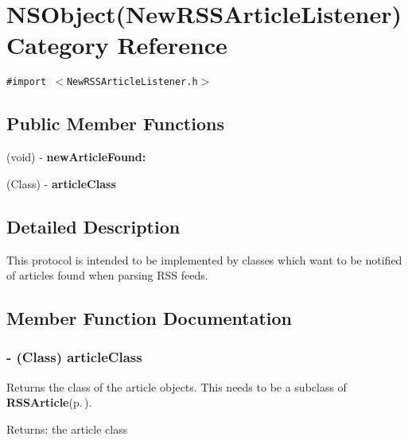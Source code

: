 \section{NSObject(New\-RSSArticle\-Listener) Category Reference}
\label{categoryNSObject(NewRSSArticleListener)}
{\tt \#import $<$New\-RSSArticle\-Listener.h$>$}

\subsection*{Public Member Functions}
\begin{CompactItemize}
\item 
(void) - {\bf new\-Article\-Found:}
\item 
(Class) - {\bf article\-Class}
\end{CompactItemize}


\subsection{Detailed Description}
This protocol is intended to be implemented by classes which want to be notified of articles found when parsing RSS feeds. 



\subsection{Member Function Documentation}
\subsubsection{\setlength{\rightskip}{0pt plus 5cm}- (Class) article\-Class }\label{categoryNSObject(NewRSSArticleListener)_cc03170efe1b023fcd88165ecfe7f1f4}


Returns the class of the article objects. This needs to be a subclass of {\bf RSSArticle}{\rm (p.\,\pageref{interfaceRSSArticle})}.

\begin{Desc}
\item[Returns:]the article class \end{Desc}

